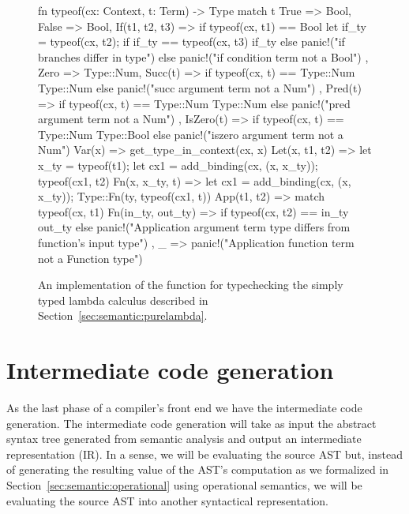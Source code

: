 \documentclass[
  oneside,
  english,
  coorientadorbanca,
  noabntexcite
]{ufsc-thesis-rn46-2019}
\newcommand{\code}[1]{\text{\scpfamily\setlength\spaceskip{0.35em}#1}}
\begin{document}
\begin{figure}[h!]
  \centering
  \begin{minipage}{0.8\textwidth}
    \begin{rustcode}
fn typeof(cx: Context, t: Term) -> Type {
  match t {
    True => Bool,
    False => Bool,
    If(t1, t2, t3) => if typeof(cx, t1) == Bool {
      let if_ty = typeof(cx, t2);
      if if_ty == typeof(cx, t3) {
        if_ty
      } else {
        panic!("if branches differ in type")
      }
    } else {
      panic!("if condition term not a Bool")
    },
    Zero => Type::Num,
    Succ(t) => if typeof(cx, t) == Type::Num {
      Type::Num
    } else {
      panic!("succ argument term not a Num")
    },
    Pred(t) => if typeof(cx, t) == Type::Num {
      Type::Num
    } else {
      panic!("pred argument term not a Num")
    },
    IsZero(t) => if typeof(cx, t) == Type::Num {
      Type::Bool
    } else {
      panic!("iszero argument term not a Num")
    }
    Var(x) => get_type_in_context(cx, x)
    Let(x, t1, t2) => {
      let x_ty = typeof(t1);
      let cx1 = add_binding(cx, (x, x_ty));
      typeof(cx1, t2)
    }
    Fn(x, x_ty, t) => {
      let cx1 = add_binding(cx, (x, x_ty));
      Type::Fn(ty, typeof(cx1, t))
    }
    App(t1, t2) => match typeof(cx, t1) {
      Fn(in_ty, out_ty) => if typeof(cx, t2) == in_ty {
        out_ty
      } else {
        panic!("Application argument term type differs from function's input type")
      },
      _ => panic!("Application function term not a Function type")
    }
  }
}
      \end{rustcode}
  \end{minipage}
  \caption{
    An implementation of the \code{typeof} function for typechecking the simply typed lambda calculus described in Section~\ref{sec:semantic:purelambda}.
  }\label{fig:typeof_impl}
\end{figure}

\section{Intermediate code generation}\label{chapter:background:sec:intermediate}

As the last phase of a compiler's front end we have the intermediate code generation.
The intermediate code generation will take as input the abstract syntax tree generated from semantic analysis and output an intermediate representation (IR).
In a sense, we will be evaluating the source AST but, instead of generating the resulting value of the AST's computation as we formalized in Section~\ref{sec:semantic:operational} using operational semantics, we will be evaluating the source AST into another syntactical representation.
\end{document}
